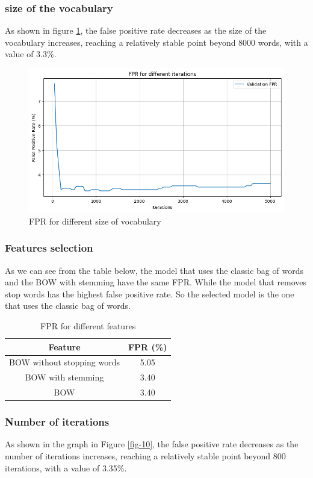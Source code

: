 \documentclass{class}
\begin{document}
\subsubsection*{size of the vocabulary}
As shown in figure \ref{fig-9}, the false positive rate decreases as the size of the vocabulary increases,
reaching a relatively stable point beyond 8000 words, with a value of 3.3\%.
\begin{figure}[h]
    \centering
    \includegraphics[width=0.7\columnwidth]{images/fpr_logreg_voc_size.png}
    \caption{FPR for different size of vocabulary}
    \label{fig-9}
\end{figure}
\subsubsection*{Features selection}
As we can see from the table below, the model that uses the classic bag of words and the BOW with stemming have the same FPR.
While the model that removes stop words has the highest false positive rate.
So the selected model is the one that uses the classic bag of words.
\begin{table}[H]
    \centering
    \begin{tabular}{|c|c|}
        \hline
        Feature                    & FPR (\%) \\
        \hline
        BOW without stopping words & 5.05     \\
        BOW with stemming          & 3.40     \\
        BOW                        & 3.40     \\
        \hline
    \end{tabular}
    \caption{FPR for different features}
    \label{tab-2}
\end{table}

\subsubsection*{Number of iterations}
As shown in the graph in Figure \ref{fig-10}, the false positive rate decreases as the number of iterations increases,
reaching a relatively stable point beyond 800 iterations, with a value of 3.35\%.
\end{document}
